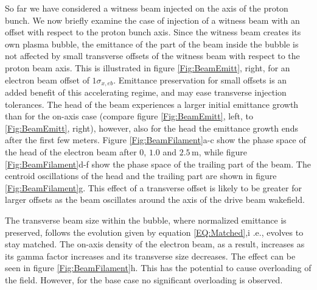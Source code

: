 \documentclass[aps,prstab,reprint,amsmath,amssymb,groupedaddress]{revtex4-1}
\newcommand{\unit}[1]{\,\mathrm{#1}}
\begin{document}
So far we have considered a witness beam injected on the axis of the proton bunch. We now briefly examine the case of
injection of a witness beam with an offset with respect to the proton bunch axis. Since the witness beam creates its own
plasma bubble, the emittance of the part of the beam inside the bubble is not affected by small transverse offsets of
the witness beam with respect to the proton beam axis. This is illustrated in figure \ref{Fig:BeamEmitt}, right, for an
electron beam offset of $1\sigma_{x,eb}$. Emittance preservation for small offsets is an added benefit of this
accelerating regime, and may ease transverse injection tolerances. The head of the beam experiences a 
larger initial emittance growth than for the on-axis case (compare figure \ref{Fig:BeamEmitt}, left, to
\ref{Fig:BeamEmitt}, right), however, also for the head the emittance growth ends after the first few meters.
Figure \ref{Fig:BeamFilament}a-c show the phase space of the head of the electron beam after $0$, $1.0$ and
$2.5\unit{m}$, while figure \ref{Fig:BeamFilament}d-f show the phase space of the trailing part of the beam. The
centroid oscillations of the head and the trailing part are shown in figure \ref{Fig:BeamFilament}g. This effect of a
transverse offset is likely to be greater for larger offsets as the beam oscillates around the axis of the drive beam
wakefield.

The transverse beam size within the bubble, where normalized emittance is preserved, follows the evolution given by
equation \ref{EQ:Matched},i .e., evolves to stay matched. The on-axis density of the electron beam, as a result,
increases as its gamma factor increases and its transverse size decreases. The effect can be seen in figure
\ref{Fig:BeamFilament}h. This has the potential to cause overloading of the field. However, for the base case no
significant overloading is observed.  
\end{document}

